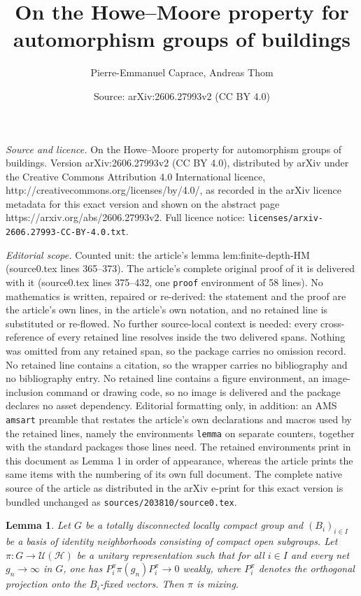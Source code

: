 \documentclass[10pt,a4paper]{amsart}
\title{On the Howe--Moore property for automorphism groups of buildings}
\author{Pierre-Emmanuel Caprace, Andreas Thom}
\date{Source: arXiv:2606.27993v2 (CC BY 4.0)}
\newtheorem{lemma}{Lemma}
\begin{document}
\maketitle

\noindent\emph{Source and licence.} On the Howe--Moore property for automorphism groups of buildings. Version arXiv:2606.27993v2 (CC BY 4.0), distributed by arXiv under the Creative Commons Attribution 4.0 International licence, http://creativecommons.org/licenses/by/4.0/, as recorded in the arXiv licence metadata for this exact version and shown on the abstract page https://arxiv.org/abs/2606.27993v2. Full licence notice: \texttt{licenses/arxiv-2606.27993-CC-BY-4.0.txt}.\par\smallskip

\noindent\textit{Editorial scope.} Counted unit: the article's lemma lem:finite-depth-HM (source0.tex lines 365--373). The article's complete original proof of it is delivered with it (source0.tex lines 375--432, one \texttt{proof} environment of 58 lines). No mathematics is written, repaired or re-derived: the statement and the proof are the article's own lines, in the article's own notation, and no retained line is substituted or re-flowed.  No further source-local context is needed: every cross-reference of every retained line resolves inside the two delivered spans.  Nothing was omitted from any retained span, so the package carries no omission record.  No retained line contains a citation, so the wrapper carries no bibliography and no bibliography entry.  No retained line contains a figure environment, an image-inclusion command or drawing code, so no image is delivered and the package declares no asset dependency.  Editorial formatting only, in addition: an AMS \texttt{amsart} preamble that restates the article's own declarations and macros used by the retained lines, namely the environments \texttt{lemma} on separate counters, together with the standard packages those lines need.  The retained environments print in this document as Lemma 1 in order of appearance, whereas the article prints the same items with the numbering of its own full document.  The complete native source of the article as distributed in the arXiv e-print for this exact version is bundled unchanged as \texttt{sources/203810/source0.tex}.
\begin{lemma}
\label{lem:finite-depth-HM}
Let $G$ be a   totally disconnected locally compact group and $(B_i)_{i \in I}$ be a basis of identity neighborhoods consisting of compact open subgroups. 
Let 
\(\pi \colon G\to\mathcal U(\mathcal H)\) be a unitary representation such that for all $i \in I$  and every net
\(g_n\to\infty\) in \(G\), one has
\(P_i^\pi\pi(g_n)P_i^\pi\to 0\) weakly, where $P^{\pi}_i$ denotes the orthogonal projection onto the $B_i$-fixed vectors.
Then $\pi$ is mixing.
\end{lemma}
\end{document}
